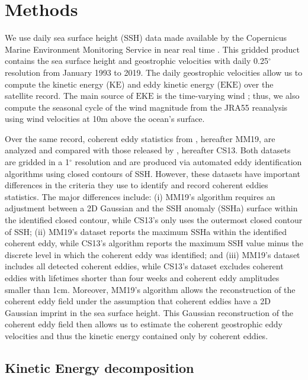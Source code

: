 \documentclass[draft,linenumbers]{agujournal2019}
\newcommand{\KE}{\textrm{KE}}
\newcommand{\EKE}{\textrm{EKE}}
\begin{document}
\section{Methods}
\label{sec:Methods}
	We use daily sea surface height (SSH) data made available by the Copernicus Marine Environment Monitoring Service in near real time \citep{CMEMS_aviso_2017}. 
	This gridded product contains the sea surface height and geostrophic velocities with daily 0.25$^\circ$ resolution from January 1993 to 2019.
	The daily geostrophic velocities allow us to compute the kinetic energy ($\KE$) and eddy kinetic energy ($\EKE$) over the satellite record. The main source of $\EKE$ is the time-varying wind \citep{Ferrari_energy_2009}; thus, we also compute the seasonal cycle of the wind magnitude from the JRA55 reanalysis \citep{JMA_JRA55_2013} using wind velocities at 10m above the ocean's surface. 

	Over the same record, coherent eddy statistics from \citet{Martinez_TKE_2019}, hereafter MM19, are analyzed and compared with those released by \citet{Chelton_mesoscale_2013}, hereafter CS13. 
	Both datasets are gridded in a 1$^\circ$ resolution and are produced via automated eddy identification algorithms using closed contours of SSH. However, these datasets have important differences in the criteria they use to identify and record coherent eddies statistics. 
	The major differences include: (i) MM19's algorithm requires an adjustment between a 2D Gaussian and the SSH anomaly (SSHa) surface within the identified closed contour, while CS13's only uses the outermost closed contour of SSH; (ii) MM19's dataset reports the maximum SSHa within the identified coherent eddy, while CS13's algorithm reports the maximum SSH value minus the discrete level in which the coherent eddy was identified; and (iii) MM19's dataset includes all detected coherent eddies, while CS13's dataset excludes coherent eddies with lifetimes shorter than four weeks and coherent eddy amplitudes smaller than 1cm. Moreover, MM19's algorithm allows the reconstruction of the coherent eddy field under the assumption that coherent eddies have a 2D Gaussian imprint in the sea surface height. This Gaussian reconstruction of the coherent eddy field  then allows us to estimate the coherent geostrophic eddy velocities and thus the kinetic energy contained only by coherent eddies.

	\subsection{Kinetic Energy decomposition}
\end{document}
